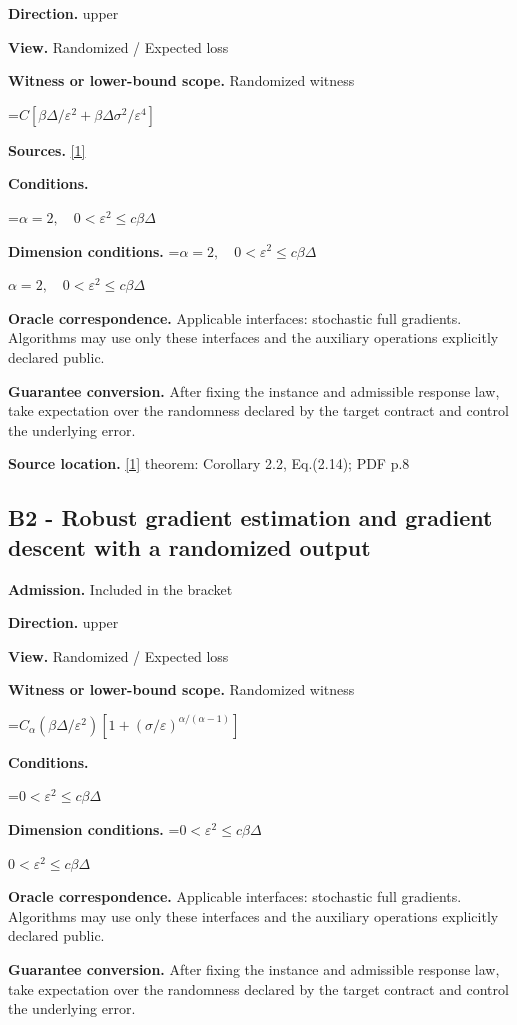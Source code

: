 \documentclass[10pt,a4paper]{article}
\newcommand{\AtlasMath}[1]{\par\begingroup\centering\setbox0=\hbox{$\displaystyle #1$}\ifdim\wd0>1.4\linewidth\typeout{ATLAS WIDE FORMULA: \the\wd0}\fi\ifdim\wd0>\linewidth\resizebox{\linewidth}{!}{\box0}\else\box0\fi\par\endgroup}
\newcommand{\AtlasInlineMath}[1]{\begingroup\setbox0=\hbox{$#1$}\ifdim\wd0>.4\linewidth\endgroup\AtlasMath{#1}\else\endgroup$#1$\fi}
\begin{document}
\textbf{Direction.} upper

\textbf{View.} Randomized / Expected loss

\textbf{Witness or lower-bound scope.} Randomized witness

\AtlasMath{C[\beta\Delta/\varepsilon^2+\beta\Delta\sigma^2/\varepsilon^4]}
\textbf{Sources.} \href{https://arxiv.org/pdf/1309.5549}{[1]}

\textbf{Conditions.} 
\AtlasMath{\alpha=2,\quad0<\varepsilon^2\le c\beta\Delta}


\textbf{Dimension conditions.} \AtlasInlineMath{\alpha=2,\quad0<\varepsilon^2\le c\beta\Delta}

\textbf{Oracle correspondence.} Applicable interfaces: stochastic full gradients. Algorithms may use only these interfaces and the auxiliary operations explicitly declared public.

\textbf{Guarantee conversion.} After fixing the instance and admissible response law, take expectation over the randomness declared by the target contract and control the underlying error.

\textbf{Source location.} \href{https://arxiv.org/pdf/1309.5549}{[1]} theorem: Corollary 2.2, Eq.(2.14); PDF p.8

\subsection{B2 - Robust gradient estimation and gradient descent with a randomized output}
\textbf{Admission.} Included in the bracket

\textbf{Direction.} upper

\textbf{View.} Randomized / Expected loss

\textbf{Witness or lower-bound scope.} Randomized witness

\AtlasMath{C_\alpha (\beta\Delta/\varepsilon^2)[1+(\sigma/\varepsilon)^{\alpha/(\alpha-1)}]}
\textbf{Conditions.} 
\AtlasMath{0<\varepsilon^2\le c\beta\Delta}


\textbf{Dimension conditions.} \AtlasInlineMath{0<\varepsilon^2\le c\beta\Delta}

\textbf{Oracle correspondence.} Applicable interfaces: stochastic full gradients. Algorithms may use only these interfaces and the auxiliary operations explicitly declared public.

\textbf{Guarantee conversion.} After fixing the instance and admissible response law, take expectation over the randomness declared by the target contract and control the underlying error.
\end{document}

